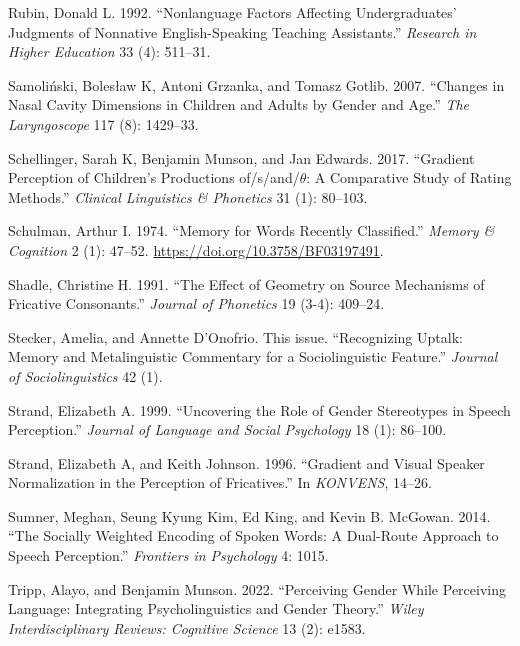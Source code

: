 \documentclass[
  letterpaper,
  DIV=11,
  numbers=noendperiod]{scrartcl}
\newlength{\cslhangindent}
\newenvironment{CSLReferences}[2] %
 {\begin{list}{}{%
  \setlength{\itemindent}{0pt}
  \setlength{\leftmargin}{0pt}
  \setlength{\parsep}{0pt}
  \ifodd #1
   \setlength{\leftmargin}{\cslhangindent}
   \setlength{\itemindent}{-1\cslhangindent}
  \fi
  \setlength{\itemsep}{#2\baselineskip}}}
 {\end{list}}
\begin{document}
\begin{CSLReferences}{1}{0}
Rubin, Donald L. 1992. {``Nonlanguage Factors Affecting Undergraduates'
Judgments of Nonnative English-Speaking Teaching Assistants.''}
\emph{Research in Higher Education} 33 (4): 511--31.

Samoliński, Bolesław K, Antoni Grzanka, and Tomasz Gotlib. 2007.
{``Changes in Nasal Cavity Dimensions in Children and Adults by Gender
and Age.''} \emph{The Laryngoscope} 117 (8): 1429--33.

Schellinger, Sarah K, Benjamin Munson, and Jan Edwards. 2017.
{``Gradient Perception of Children's Productions of/s/and/\(\theta\): A
Comparative Study of Rating Methods.''} \emph{Clinical Linguistics \&
Phonetics} 31 (1): 80--103.

Schulman, Arthur I. 1974. {``Memory for Words Recently Classified.''}
\emph{Memory \& Cognition} 2 (1): 47--52.
\url{https://doi.org/10.3758/BF03197491}.

Shadle, Christine H. 1991. {``The Effect of Geometry on Source
Mechanisms of Fricative Consonants.''} \emph{Journal of Phonetics} 19
(3-4): 409--24.

Stecker, Amelia, and Annette D'Onofrio. This issue. {``Recognizing
Uptalk: Memory and Metalinguistic Commentary for a Sociolinguistic
Feature.''} \emph{Journal of Sociolinguistics} 42 (1).

Strand, Elizabeth A. 1999. {``Uncovering the Role of Gender Stereotypes
in Speech Perception.''} \emph{Journal of Language and Social
Psychology} 18 (1): 86--100.

Strand, Elizabeth A, and Keith Johnson. 1996. {``Gradient and Visual
Speaker Normalization in the Perception of Fricatives.''} In
\emph{KONVENS}, 14--26.

Sumner, Meghan, Seung Kyung Kim, Ed King, and Kevin B. McGowan. 2014.
{``The Socially Weighted Encoding of Spoken Words: A Dual-Route Approach
to Speech Perception.''} \emph{Frontiers in Psychology} 4: 1015.

Tripp, Alayo, and Benjamin Munson. 2022. {``Perceiving Gender While
Perceiving Language: Integrating Psycholinguistics and Gender Theory.''}
\emph{Wiley Interdisciplinary Reviews: Cognitive Science} 13 (2): e1583.


\end{CSLReferences}
\end{document}
